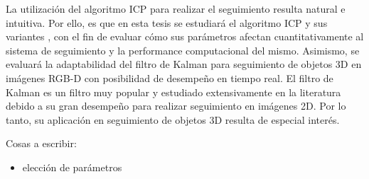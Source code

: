 La utilización del algoritmo ICP \cite{zhang94icp,besl92icp} para realizar el seguimiento resulta natural e intuitiva. Por ello, es que en esta tesis se estudiará el algoritmo ICP y sus variantes \cite{estepar2004robust,segal2009generalized}, con el fin de evaluar cómo sus parámetros afectan cuantitativamente al sistema de seguimiento y la performance computacional del mismo. Asimismo, se evaluará la adaptabilidad del filtro de Kalman \cite{welch1995introduction} para seguimiento de objetos 3D en imágenes RGB-D con posibilidad de desempeño en tiempo real. El filtro de Kalman es un filtro muy popular y estudiado extensivamente en la literatura \cite{julier1997new,wan2000unscented} debido a su gran desempeño para realizar seguimiento en imágenes 2D. Por lo tanto, su aplicación en seguimiento de objetos 3D resulta de especial interés.

Cosas a escribir:
\begin{itemize}
	\item elección de parámetros
\end{itemize}


